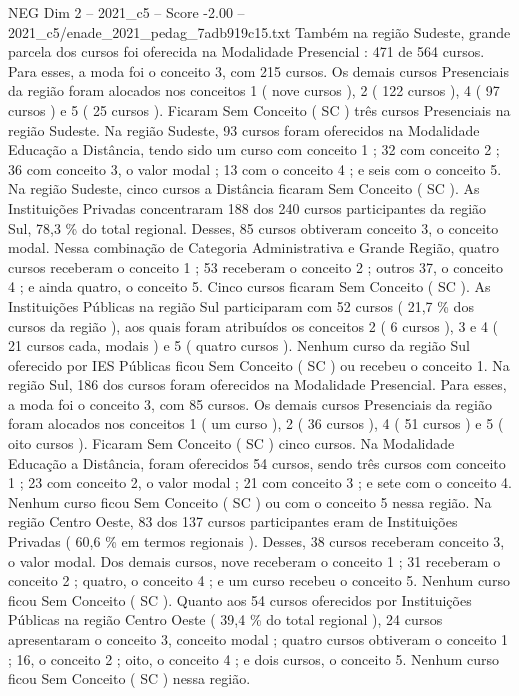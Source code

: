 \begin{textsample}{NEG Dim 2 – 2021\_c5 – Score -2.00 – 2021\_c5/enade\_2021\_pedag\_7adb919c15.txt}
Também na região Sudeste, grande parcela dos cursos foi oferecida na Modalidade Presencial : 471 de 564 cursos.
Para esses, a moda foi o conceito 3, com 215 cursos.
Os demais cursos Presenciais da região foram alocados nos conceitos 1 ( nove cursos ), 2 ( 122 cursos ), 4 ( 97 cursos ) e 5 ( 25 cursos ).
Ficaram Sem Conceito ( SC ) três cursos Presenciais na região Sudeste.
Na região Sudeste, 93 cursos foram oferecidos na Modalidade Educação a Distância, tendo sido um curso com conceito 1 ; 32 com conceito 2 ; 36 com conceito 3, o valor modal ; 13 com o conceito 4 ; e seis com o conceito 5.
Na região Sudeste, cinco cursos a Distância ficaram Sem Conceito ( SC ).
As Instituições Privadas concentraram 188 dos 240 cursos participantes da região Sul, 78,3 \% do total regional.
Desses, 85 cursos obtiveram conceito 3, o conceito modal.
Nessa combinação de Categoria Administrativa e Grande Região, quatro cursos receberam o conceito 1 ; 53 receberam o conceito 2 ; outros 37, o conceito 4 ; e ainda quatro, o conceito 5.
Cinco cursos ficaram Sem Conceito ( SC ).
As Instituições Públicas na região Sul participaram com 52 cursos ( 21,7 \% dos cursos da região ), aos quais foram atribuídos os conceitos 2 ( 6 cursos ), 3 e 4 ( 21 cursos cada, modais ) e 5 ( quatro cursos ).
Nenhum curso da região Sul oferecido por IES Públicas ficou Sem Conceito ( SC ) ou recebeu o conceito 1.
Na região Sul, 186 dos cursos foram oferecidos na Modalidade Presencial.
Para esses, a moda foi o conceito 3, com 85 cursos.
Os demais cursos Presenciais da região foram alocados nos conceitos 1 ( um curso ), 2 ( 36 cursos ), 4 ( 51 cursos ) e 5 ( oito cursos ).
Ficaram Sem Conceito ( SC ) cinco cursos.
Na Modalidade Educação a Distância, foram oferecidos 54 cursos, sendo três cursos com conceito 1 ; 23 com conceito 2, o valor modal ; 21 com conceito 3 ; e sete com o conceito 4.
Nenhum curso ficou Sem Conceito ( SC ) ou com o conceito 5 nessa região.
Na região Centro Oeste, 83 dos 137 cursos participantes eram de Instituições Privadas ( 60,6 \% em termos regionais ).
Desses, 38 cursos receberam conceito 3, o valor modal.
Dos demais cursos, nove receberam o conceito 1 ; 31 receberam o conceito 2 ; quatro, o conceito 4 ; e um curso recebeu o conceito 5.
Nenhum curso ficou Sem Conceito ( SC ).
Quanto aos 54 cursos oferecidos por Instituições Públicas na região Centro Oeste ( 39,4 \% do total regional ), 24 cursos apresentaram o conceito 3, conceito modal ; quatro cursos obtiveram o conceito 1 ; 16, o conceito 2 ; oito, o conceito 4 ; e dois cursos, o conceito 5.
Nenhum curso ficou Sem Conceito ( SC ) nessa região.

\end{textsample}
